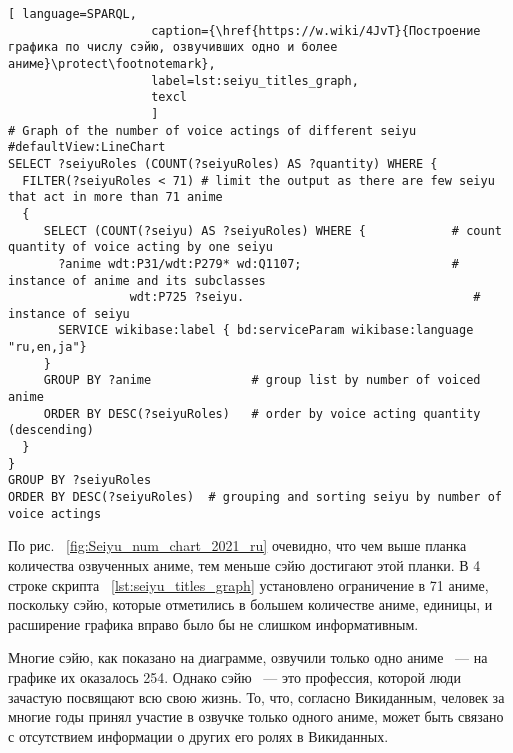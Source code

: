 \begin{fullwidth}
\lstset{numbers=left, firstnumber=1, frame=single}
\begin{lstlisting}[ language=SPARQL, 
                    caption={\href{https://w.wiki/4JvT}{Построение графика по числу сэйю, озвучивших одно и более аниме}\protect\footnotemark},
                    label=lst:seiyu_titles_graph,
                    texcl 
                    ]
# Graph of the number of voice actings of different seiyu
#defaultView:LineChart
SELECT ?seiyuRoles (COUNT(?seiyuRoles) AS ?quantity) WHERE {
  FILTER(?seiyuRoles < 71) # limit the output as there are few seiyu that act in more than 71 anime
  {
     SELECT (COUNT(?seiyu) AS ?seiyuRoles) WHERE {            # count quantity of voice acting by one seiyu
       ?anime wdt:P31/wdt:P279* wd:Q1107;                     # instance of anime and its subclasses
                 wdt:P725 ?seiyu.                                # instance of seiyu
       SERVICE wikibase:label { bd:serviceParam wikibase:language "ru,en,ja"}
     }
     GROUP BY ?anime              # group list by number of voiced anime
     ORDER BY DESC(?seiyuRoles)   # order by voice acting quantity (descending)
  }
}
GROUP BY ?seiyuRoles
ORDER BY DESC(?seiyuRoles)  # grouping and sorting seiyu by number of voice actings
\end{lstlisting}%
\lstset{numbers=none}
\end{fullwidth}

По рис. ~\ref{fig:Seiyu_num_chart_2021_ru} очевидно, что чем выше планка количества озвученных аниме, тем меньше сэйю достигают этой планки. В \num{4} строке скрипта ~\protect\ref{lst:seiyu_titles_graph} установлено ограничение в \num{71} аниме, поскольку сэйю, которые отметились в большем количестве аниме, единицы, и расширение графика вправо было бы не слишком информативным.

Многие сэйю, как показано на диаграмме, озвучили только одно аниме ~--- на графике их оказалось \num{254}. Однако сэйю ~--- это профессия, которой люди зачастую посвящают всю свою жизнь. То, что, согласно Викиданным, человек за многие годы принял участие в озвучке только одного аниме, может быть связано с отсутствием информации о других его ролях в Викиданных. 

\begin{figure*}[h]

    \setlength{\fboxsep}{0pt}%
    \setlength{\fboxrule}{1pt}%
	\caption[График числа ролей, озвученных различными сэйю, 2021.]{График числа ролей, озвученных различными сэйю, 2021. График построен на основе данных, полученных с помощью запроса~\protect\ref{lst:seiyu_titles_graph}.}%
    \label{fig:Seiyu_num_chart_2021_ru}%
\end{figure*} 


